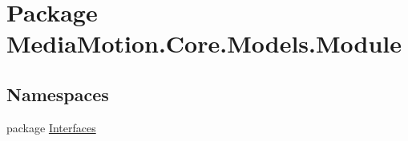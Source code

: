 \hypertarget{namespace_media_motion_1_1_core_1_1_models_1_1_module}{\section{Package Media\+Motion.\+Core.\+Models.\+Module}
\label{namespace_media_motion_1_1_core_1_1_models_1_1_module}
}
\subsection*{Namespaces}
\begin{DoxyCompactItemize}
\item 
package \hyperlink{namespace_media_motion_1_1_core_1_1_models_1_1_module_1_1_interfaces}{Interfaces}
\end{DoxyCompactItemize}
